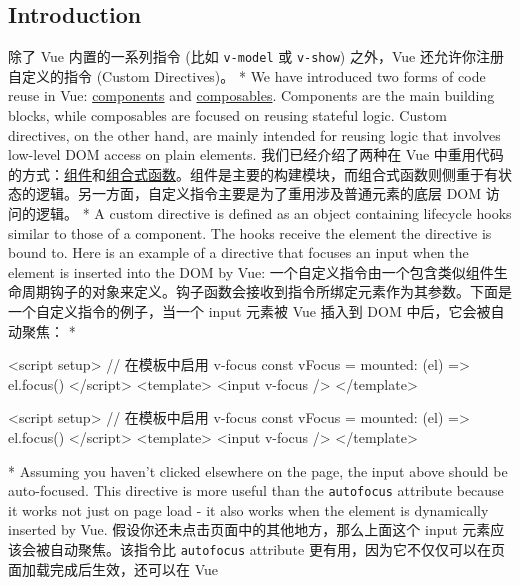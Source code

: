 \begin{paracol}{2}
\subsection{Introduction}
\switchcolumn
除了 Vue 内置的一系列指令 (比如 \texttt{v-model} 或 \texttt{v-show})
之外，Vue 还允许你注册自定义的指令 (Custom Directives)。 
\switchcolumn[0]*%
We have introduced two forms of code reuse in Vue:
\href{https://vuejs.org/guide/essentials/component-basics.html}{components}
and
\href{https://vuejs.org/guide/reusability/composables.html}{composables}.
Components are the main building blocks, while composables are focused
on reusing stateful logic. Custom directives, on the other hand, are
mainly intended for reusing logic that involves low-level DOM access on
plain elements.
\switchcolumn
我们已经介绍了两种在 Vue
中重用代码的方式：\href{https://cn.vuejs.org/guide/essentials/component-basics.html}{组件}和\href{https://cn.vuejs.org/guide/reusability/composables.html}{组合式函数}。组件是主要的构建模块，而组合式函数则侧重于有状态的逻辑。另一方面，自定义指令主要是为了重用涉及普通元素的底层
DOM 访问的逻辑。
\switchcolumn[0]*%
A custom directive is defined as an object containing lifecycle hooks
similar to those of a component. The hooks receive the element the
directive is bound to. Here is an example of a directive that focuses an
input when the element is inserted into the DOM by Vue:
\switchcolumn
一个自定义指令由一个包含类似组件生命周期钩子的对象来定义。钩子函数会接收到指令所绑定元素作为其参数。下面是一个自定义指令的例子，当一个
input 元素被 Vue 插入到 DOM 中后，它会被自动聚焦：
\switchcolumn[0]*%
\begin{codeHtml}
<script setup>
// 在模板中启用 v-focus
const vFocus = {
  mounted: (el) => el.focus()
}
</script>
<template>
  <input v-focus />
</template>
\end{codeHtml}
\switchcolumn
\begin{codeHtml}
<script setup>
// 在模板中启用 v-focus
const vFocus = {
  mounted: (el) => el.focus()
}
</script>
<template>
  <input v-focus />
</template>
\end{codeHtml}
\switchcolumn[0]*%
Assuming you haven't clicked elsewhere on the page, the input above
should be auto-focused. This directive is more useful than the
\texttt{autofocus} attribute because it works not just on page load - it
also works when the element is dynamically inserted by Vue.
\switchcolumn
假设你还未点击页面中的其他地方，那么上面这个 input
元素应该会被自动聚焦。该指令比 \texttt{autofocus} attribute
更有用，因为它不仅仅可以在页面加载完成后生效，还可以在 Vue

\end{paracol}

